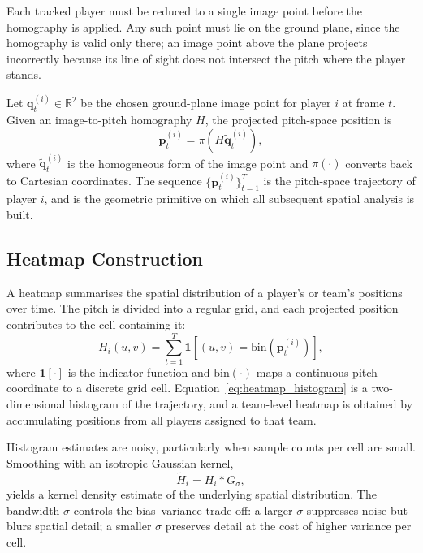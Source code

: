 Each tracked player must be reduced to a single image 
point before the homography is applied. Any such point 
must lie on the ground plane, since the homography is 
valid only there; an image point above the plane projects 
incorrectly because its line of sight does not intersect 
the pitch where the player stands.

Let \(\mathbf{q}_t^{(i)} \in \mathbb{R}^2\) be the chosen 
ground-plane image point for player \(i\) at frame \(t\). 
Given an image-to-pitch homography \(H\), the projected 
pitch-space position is
\begin{equation}
    \mathbf{p}_t^{(i)}
    = \pi\!\left(H\tilde{\mathbf{q}}_t^{(i)}\right),
    \label{eq:player_projection}
\end{equation}
where \(\tilde{\mathbf{q}}_t^{(i)}\) is the homogeneous 
form of the image point and \(\pi(\cdot)\) converts back 
to Cartesian coordinates. The sequence
\(\{\mathbf{p}_t^{(i)}\}_{t=1}^{T}\) is the pitch-space 
trajectory of player \(i\), and is the geometric primitive 
on which all subsequent spatial analysis is built.

\subsection{Heatmap Construction}
\label{subsec:background_heatmaps}

A heatmap summarises the spatial distribution of a 
player's or team's positions over time. The pitch is 
divided into a regular grid, and each projected position 
contributes to the cell containing it:
\begin{equation}
    H_i(u,v)
    = \sum_{t=1}^{T}
    \mathbf{1}\!\left[
    (u,v) = \mathrm{bin}\!\left(\mathbf{p}_t^{(i)}\right)
    \right],
    \label{eq:heatmap_histogram}
\end{equation}
where \(\mathbf{1}[\cdot]\) is the indicator function and 
\(\mathrm{bin}(\cdot)\) maps a continuous pitch coordinate 
to a discrete grid cell. Equation~\ref{eq:heatmap_histogram} 
is a two-dimensional histogram of the trajectory, and a 
team-level heatmap is obtained by accumulating positions 
from all players assigned to that team.

Histogram estimates are noisy, particularly when sample 
counts per cell are small. Smoothing with an isotropic 
Gaussian kernel,
\begin{equation}
    \tilde{H}_i = H_i * G_{\sigma},
    \label{eq:heatmap_smoothing}
\end{equation}
yields a kernel density estimate of the underlying spatial 
distribution. The bandwidth \(\sigma\) controls the 
bias--variance trade-off: a larger \(\sigma\) suppresses 
noise but blurs spatial detail; a smaller \(\sigma\) 
preserves detail at the cost of higher variance per cell.

